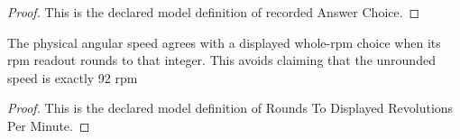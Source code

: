 \begin{proof}
  This is the declared model definition of recorded Answer Choice.
\end{proof}
\begin{definition}
  \label{def:physics:phyx-mini-0698:phyxminiproblems-problemphyxmini0698-roundstodisplayedrevolutionsperminute}
  The physical angular speed agrees with a displayed whole-rpm choice when its rpm readout rounds to that integer. This avoids claiming that the unrounded speed is exactly 92 rpm
\end{definition}
\begin{proof}
  This is the declared model definition of Rounds To Displayed Revolutions Per Minute.
\end{proof}
